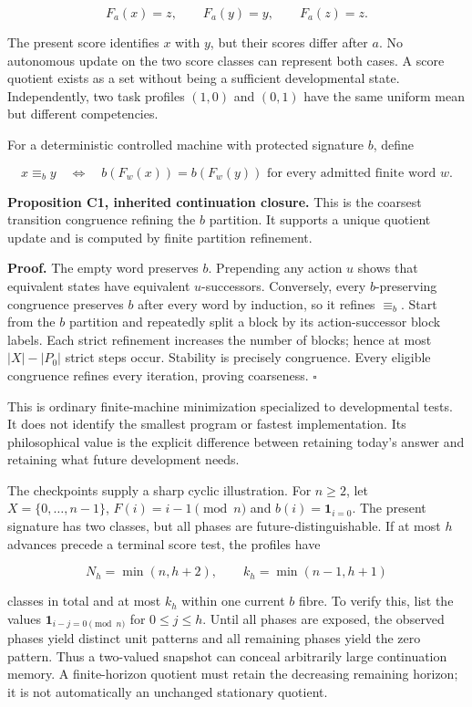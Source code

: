\documentclass[
  11pt,
  a4paper,
]{article}
\begin{document}
\[F_a(x)=z,\qquad F_a(y)=y,\qquad F_a(z)=z.\]

The present score identifies \(x\) with \(y\), but their scores differ
after \(a\). No autonomous update on the two score classes can represent
both cases. A score quotient exists as a set without being a sufficient
developmental state. Independently, two task profiles \((1,0)\) and
\((0,1)\) have the same uniform mean but different competencies.

For a deterministic controlled machine with protected signature \(b\),
define

\[x\equiv_b y\quad\Longleftrightarrow\quad b(F_w(x))=b(F_w(y))\text{ for every admitted finite word }w.\]

\textbf{Proposition C1, inherited continuation closure.} This is the
coarsest transition congruence refining the \(b\) partition. It supports
a unique quotient update and is computed by finite partition refinement.

\textbf{Proof.} The empty word preserves \(b\). Prepending any action
\(u\) shows that equivalent states have equivalent \(u\)-successors.
Conversely, every \(b\)-preserving congruence preserves \(b\) after
every word by induction, so it refines \(\equiv_b\). Start from the
\(b\) partition and repeatedly split a block by its action-successor
block labels. Each strict refinement increases the number of blocks;
hence at most \(|X|-|P_0|\) strict steps occur. Stability is precisely
congruence. Every eligible congruence refines every iteration, proving
coarseness. \(\square\)

This is ordinary finite-machine minimization specialized to
developmental tests. It does not identify the smallest program or
fastest implementation. Its philosophical value is the explicit
difference between retaining today's answer and retaining what future
development needs.

The checkpoints supply a sharp cyclic illustration. For \(n\ge2\), let
\(X=\{0,\ldots,n-1\}\), \(F(i)=i-1\pmod n\) and \(b(i)=\mathbf1_{i=0}\).
The present signature has two classes, but all phases are
future-distinguishable. If at most \(h\) advances precede a terminal
score test, the profiles have

\[N_h=\min(n,h+2),\qquad k_h=\min(n-1,h+1)\]

classes in total and at most \(k_h\) within one current \(b\) fibre. To
verify this, list the values \(\mathbf1_{i-j=0\pmod n}\) for
\(0\le j\le h\). Until all phases are exposed, the observed phases yield
distinct unit patterns and all remaining phases yield the zero pattern.
Thus a two-valued snapshot can conceal arbitrarily large continuation
memory. A finite-horizon quotient must retain the decreasing remaining
horizon; it is not automatically an unchanged stationary quotient.
\end{document}
